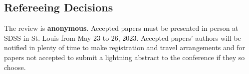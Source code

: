 \documentclass[10pt]{article}
\begin{document}
\subsection{Refereeing Decisions}
The review is \textbf{anonymous}. Accepted papers must be presented in person at SDSS in St. Louis
from May 23 to 26, 2023.
Accepted papers' authors will be notified in plenty of time to make registration and travel
arrangements and for papers not accepted to submit a lightning abstract to the
conference if they so choose.


\end{document}
